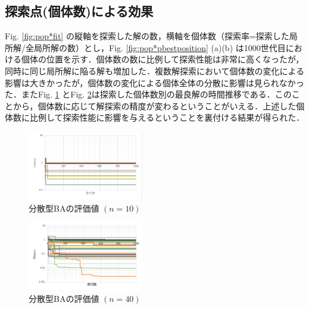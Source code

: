 \documentclass{jarticle}
\begin{document}
\subsection{探索点(個体数)による効果}
Fig. \ref{fig:pop*fit} の縦軸を探索した解の数，横軸を個体数（探索率=探索した局所解/全局所解の数）とし，Fig. \ref{fig:pop*pbestposition} (a)(b) は1000世代目における個体の位置を示す．個体数の数に比例して探索性能は非常に高くなったが，同時に同じ局所解に陥る解も増加した．複数解探索において個体数の変化による影響は大きかったが，個体数の変化による個体全体の分散に影響は見られなかった．またFig. \ref{fig:fit_n=10} とFig. \ref{fig:fit_n=40}は探索した個体数別の最良解の時間推移である．このことから，個体数に応じて解探索の精度が変わるということがいえる．上述した個体数に比例して探索性能に影響を与えるということを裏付ける結果が得られた．
\begin{figure}[h]
\begin{center}
\includegraphics[width=0.45\textwidth]{sbat01_n10_pbest.bmp}
\caption{分散型BAの評価値 ${(n=10)}$}
\label{fig:fit_n=10}
\end{center}
\end{figure}

\begin{figure}[h]
\begin{center}
\includegraphics[width=0.45\textwidth]{sbat01_n40_pbest.bmp}
\caption{分散型BAの評価値 ${(n=40)}$}
\label{fig:fit_n=40}
\end{center}
\end{figure}
\end{document}
